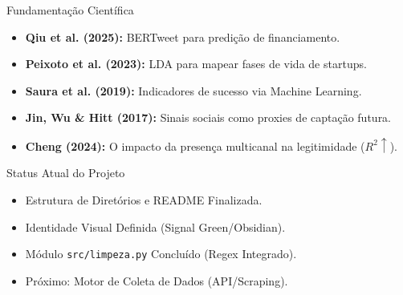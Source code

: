 \documentclass[12pt, aspectratio=169]{beamer}
\begin{document}
\begin{frame}{Fundamentação Científica}
  \small
  \begin{itemize}
    \item \textbf{Qiu et al. (2025):} BERTweet para predição de financiamento.
    \item \textbf{Peixoto et al. (2023):} LDA para mapear fases de vida de startups.
    \item \textbf{Saura et al. (2019):} Indicadores de sucesso via Machine Learning.
    \item \textbf{Jin, Wu \& Hitt (2017):} Sinais sociais como proxies de captação futura.
    \item \textbf{Cheng (2024):} O impacto da presença multicanal na legitimidade ($R^2 \uparrow$).
  \end{itemize}
\end{frame}

\begin{frame}{Status Atual do Projeto}
  \centering
  \begin{itemize}
    \item[\checkmark] Estrutura de Diretórios e README Finalizada.
    \item[\checkmark] Identidade Visual Definida (Signal Green/Obsidian).
    \item[\checkmark] Módulo \texttt{src/limpeza.py} Concluído (Regex Integrado).
    \item[$\rightarrow$] Próximo: Motor de Coleta de Dados (API/Scraping).
  \end{itemize}
\end{frame}
\end{document}
